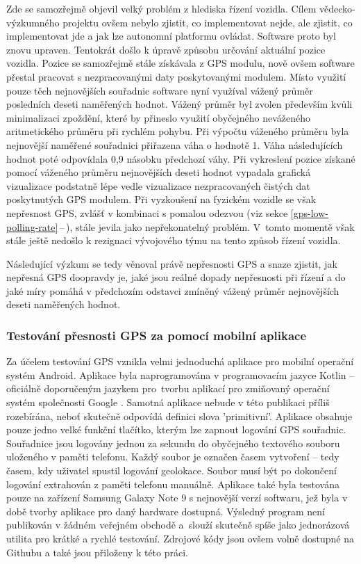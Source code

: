 \documentclass[czech, bachelor]{diploma}
\newcommand{\filipref}[1]{\ref{#1}\,--\,\nameref{#1}}
\begin{document}
Zde se samozřejmě objevil velký problém z hlediska řízení vozidla. Cílem vědecko-výzkumného projektu ovšem nebylo zjistit, co
implementovat nejde, ale zjistit, co implementovat jde a jak lze autonomní platformu ovládat. Software proto byl znovu upraven.
Tentokrát došlo k úpravě způsobu určování aktuální pozice vozidla. Pozice se samozřejmě stále získávala z GPS modulu, nově ovšem
software přestal pracovat s nezpracovanými daty poskytovanými modulem. Místo využití pouze těch nejnovějších souřadnic software
nyní využíval vážený průměr posledních deseti naměřených hodnot. Vážený průměr byl zvolen především kvůli minimalizaci zpoždění,
které by přineslo využití obyčejného neváženého aritmetického průměru při rychlém pohybu. Při výpočtu váženého průměru byla
nejnovější naměřené souřadnici přiřazena váha o hodnotě 1. Váha následujících hodnot poté odpovídala 0,9 násobku předchozí váhy.
Při vykreslení pozice získané pomocí váženého průměru nejnovějších deseti hodnot vypadala grafická vizualizace podstatně lépe
vedle vizualizace nezpracovaných čistých dat poskytnutých GPS modulem. Při vyzkoušení na fyzickém vozidle se však nepřesnost GPS,
zvlášť v kombinaci s pomalou odezvou (viz sekce \filipref{gps-low-polling-rate}), stále jevila jako nepřekonatelný problém.
V~tomto momentě však stále ještě nedošlo k rezignaci vývojového týmu na tento způsob řízení vozidla.

Následující výzkum se tedy věnoval právě nepřesnosti GPS a snaze zjistit, jak nepřesná GPS doopravdy je, jaké jsou reálné dopady
nepřesnosti při řízení a do jaké míry pomáhá v předchozím odstavci zmíněný vážený průměr nejnovějších deseti naměřených hodnot.

\subsubsection{Testování přesnosti GPS za pomocí mobilní aplikace}

Za účelem testování GPS vznikla velmi jednoduchá aplikace pro mobilní operační systém Android. Aplikace byla naprogramována
v programovacím jazyce Kotlin -- oficiálně doporučeným jazykem pro~tvorbu aplikací pro zmiňovaný operační systém společnosti
Google \cite{kotlin-android-source}. Samotná aplikace nebude v této publikaci příliš rozebírána, neboť skutečně odpovídá definici
slova 'primitivní'. Aplikace obsahuje pouze jedno velké funkční tlačítko, kterým lze zapnout logování GPS souřadnic. Souřadnice
jsou logovány jednou za sekundu do obyčejného textového souboru uloženého v paměti telefonu. Každý soubor je označen časem
vytvoření -- tedy časem, kdy uživatel spustil logování geolokace. Soubor musí být po dokončení logování extrahován z paměti
telefonu manuálně. Aplikace také byla testována pouze na zařízení Samsung Galaxy Note 9 s nejnovější verzí softwaru, jež byla
v době tvorby aplikace pro daný hardware dostupná. Výsledný program není publikován v žádném veřejném obchodě a~slouží skutečně
spíše jako jednorázová utilita pro krátké a rychlé testování. Zdrojové kódy jsou ovšem volně dostupné na Githubu
\cite{geologger-source} a také jsou přiloženy k této práci.
\end{document}
